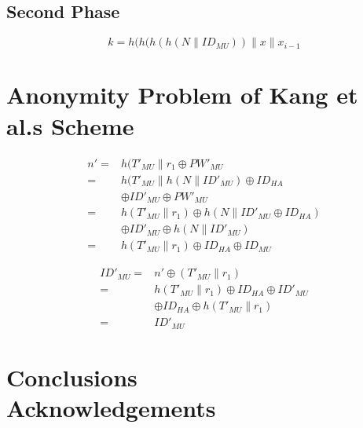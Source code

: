 \documentclass[UTF8]{ctexart}
\begin{document}
\subsection{Second Phase}
\begin{equation}
k=h(h(h(h(N\|ID_{MU}))\|x\|x_{i-1}
\end{equation}

\section{Anonymity Problem of Kang et al.s Scheme}
\begin{equation}
\begin{aligned}
n'=&h(T'_{MU}\|r_{1}\oplus PW'_{MU}\\
  =&h(T'_{MU}\|h(N\|ID'_{MU})\oplus ID_{HA}\\
   &  \oplus ID'_{MU}\oplus PW'_{MU} \\
  =&h(T'_{MU}\|r_{1})\oplus h(N\|ID'_{MU}\oplus ID_{HA})\\
   &  \oplus ID'_{MU}\oplus h(N\|ID'_{MU})\\
  =& h(T'_{MU}\|r_{1})\oplus ID_{HA}\oplus ID_{MU}
\end{aligned}
\end{equation}

\begin{equation}
\begin{aligned}
ID'_{MU} =& n'\oplus(T'_{MU}\|r_{1})\\
         =& h(T'_{MU}\|r_{1})\oplus ID_{HA}\oplus ID'_{MU}\\
          & \oplus ID_{HA}\oplus h(T'_{MU}\|r_{1})\\
         =& ID'_{MU}
\end{aligned}
\end{equation}

\section{Conclusions\\Acknowledgements}
\end{document}
